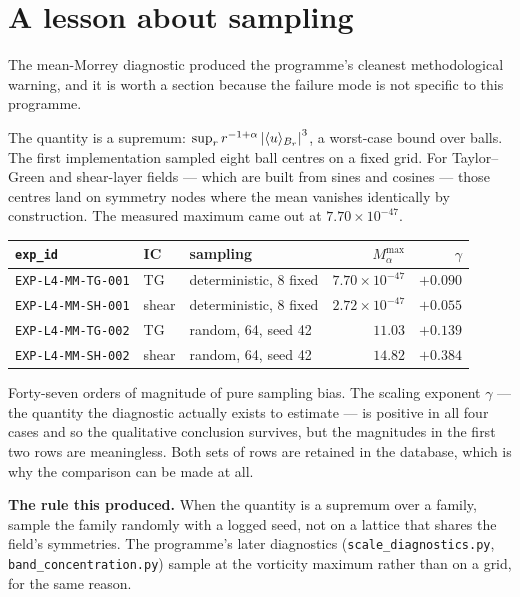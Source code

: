 \section{A lesson about sampling}
\label{sec:sampling-lesson}

The mean-Morrey diagnostic produced the programme's cleanest methodological
warning, and it is worth a section because the failure mode is not specific to
this programme.

The quantity is a supremum: \(\sup_r r^{-1+\alpha}\left|\langle
u\rangle_{B_r}\right|^3\), a worst-case bound over balls. The first implementation
sampled eight ball centres on a fixed grid. For Taylor--Green and shear-layer
fields --- which are built from sines and cosines --- those centres land on
symmetry nodes where the mean vanishes identically by construction. The
measured maximum came out at \(7.70\times10^{-47}\).

\begin{center}
\small
\begin{tabular}{@{}l l l r r@{}}
\toprule
\texttt{exp\_id} & IC & sampling & \(M_\alpha^{\max}\) & \(\gamma\) \\
\midrule
\texttt{EXP-L4-MM-TG-001} & TG & deterministic, 8 fixed & \(7.70\!\times\!10^{-47}\) & \(+0.090\) \\
\texttt{EXP-L4-MM-SH-001} & shear & deterministic, 8 fixed & \(2.72\!\times\!10^{-47}\) & \(+0.055\) \\
\texttt{EXP-L4-MM-TG-002} & TG & random, 64, seed 42 & \(\mathbf{11.03}\) & \(+0.139\) \\
\texttt{EXP-L4-MM-SH-002} & shear & random, 64, seed 42 & \(\mathbf{14.82}\) & \(+0.384\) \\
\bottomrule
\end{tabular}
\end{center}

\medskip
Forty-seven orders of magnitude of pure sampling bias. The scaling exponent
\(\gamma\) --- the quantity the diagnostic actually exists to estimate --- is
positive in all four cases and so the qualitative conclusion survives, but the
magnitudes in the first two rows are meaningless. Both sets of rows are
retained in the database, which is why the comparison can be made at all.

\begin{record}
\textbf{The rule this produced.} When the quantity is a supremum over a
family, sample the family randomly with a logged seed, not on a lattice that
shares the field's symmetries. The programme's later diagnostics
(\texttt{scale\_diagnostics.py}, \texttt{band\_concentration.py}) sample at the
vorticity maximum rather than on a grid, for the same reason.
\end{record}

